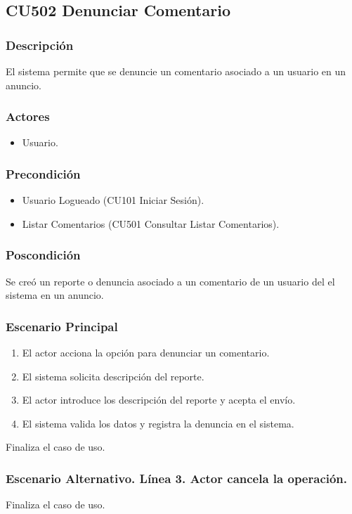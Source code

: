 \subsection{CU502 Denunciar Comentario}
\subsubsection{Descripci\'{o}n}
El sistema permite que se denuncie un comentario asociado a un usuario en un anuncio.
\subsubsection{Actores}
\begin{itemize}
\item Usuario.
\end{itemize}
\subsubsection{Precondici\'{o}n}
\begin{itemize}
\item Usuario Logueado (CU101 Iniciar Sesi\'{o}n).
\item Listar Comentarios (CU501 Consultar Listar Comentarios).
\end{itemize}
\subsubsection{Poscondici\'{o}n}
Se cre\'{o} un reporte o denuncia asociado a un comentario de un usuario del el sistema en un anuncio.
\subsubsection{Escenario Principal}
\begin{enumerate}
\item El actor acciona la opci\'{o}n para denunciar un comentario.
\item El sistema solicita descripci\'{o}n del reporte.
\item El actor introduce los descripci\'{o}n del reporte y acepta el env\'{i}o.
\item El sistema valida los datos y registra la denuncia en el sistema.
\end{enumerate}
Finaliza el caso de uso.
\subsubsection{Escenario Alternativo. L\'{i}nea 3. Actor cancela la operaci\'{o}n.}
Finaliza el caso de uso.
